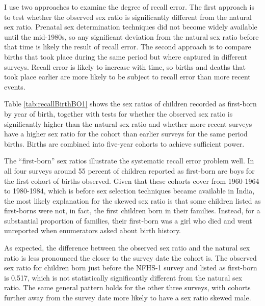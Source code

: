 \documentclass[12pt,letterpaper]{article}
\begin{document}
I use two approaches to examine the degree of recall error.
The first approach is to test whether the observed sex ratio is significantly different
from the natural sex ratio.
Prenatal sex determination techniques did not become widely available until the mid-1980s, 
so any significant deviation from the natural sex ratio before that time is likely the 
result of recall error.
The second approach is to compare births that took place during the same period but
where captured in different surveys.
Recall error is likely to increase with time, so births and deaths that took place earlier 
are more likely to be subject to recall error than more recent events.

Table \ref{tab:recallBirthBO1} shows the sex ratios of children recorded as first-born by 
year of birth, together with tests for whether the observed sex ratio is significantly 
higher than the natural sex ratio and whether more recent surveys have a higher sex ratio 
for the cohort than earlier surveys for the same period births.
Births are combined into five-year cohorts to achieve sufficient power.



% 


The ``first-born'' sex ratios illustrate the systematic recall error problem well.
In all four surveys around 55 percent of children reported as first-born are boys
for the first cohort of births observed.
Given that these cohorts cover from 1960-1964 to 1980-1984, which is before sex selection 
techniques became available in India, the most likely explanation for the skewed sex ratio 
is that some children listed as first-borns were not, in fact, the first children born in 
their families.
Instead, for a substantial proportion of families, their first-born was a girl who died 
and went unreported when enumerators asked about birth history.

As expected, the difference between the observed sex ratio and the natural sex ratio is 
less pronounced the closer to the survey date the cohort is.
The observed sex ratio for children born just before the NFHS-1 survey and listed as 
first-born is 0.517, which is not statistically significantly different from the
natural sex ratio.
The same general pattern holds for the other three surveys, with cohorts further away
from the survey date more likely to have a sex ratio skewed male.

\end{document}

